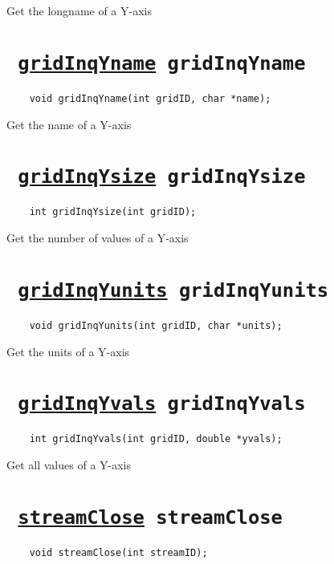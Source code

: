 Get the longname of a Y-axis
\ifpdfoutput{}{(\ref{gridInqYlongname})}


\section*{\tt 
\ifpdf
\hyperref[gridInqYname]{gridInqYname}
\else
gridInqYname
\fi
}
\begin{verbatim}
    void gridInqYname(int gridID, char *name);
\end{verbatim}

Get the name of a Y-axis
\ifpdfoutput{}{(\ref{gridInqYname})}


\section*{\tt 
\ifpdf
\hyperref[gridInqYsize]{gridInqYsize}
\else
gridInqYsize
\fi
}
\begin{verbatim}
    int gridInqYsize(int gridID);
\end{verbatim}

Get the number of values of a Y-axis
\ifpdfoutput{}{(\ref{gridInqYsize})}


\section*{\tt 
\ifpdf
\hyperref[gridInqYunits]{gridInqYunits}
\else
gridInqYunits
\fi
}
\begin{verbatim}
    void gridInqYunits(int gridID, char *units);
\end{verbatim}

Get the units of a Y-axis
\ifpdfoutput{}{(\ref{gridInqYunits})}


\section*{\tt 
\ifpdf
\hyperref[gridInqYvals]{gridInqYvals}
\else
gridInqYvals
\fi
}
\begin{verbatim}
    int gridInqYvals(int gridID, double *yvals);
\end{verbatim}

Get all values of a Y-axis
\ifpdfoutput{}{(\ref{gridInqYvals})}


\section*{\tt 
\ifpdf
\hyperref[streamClose]{streamClose}
\else
streamClose
\fi
}
\begin{verbatim}
    void streamClose(int streamID);
\end{verbatim}

